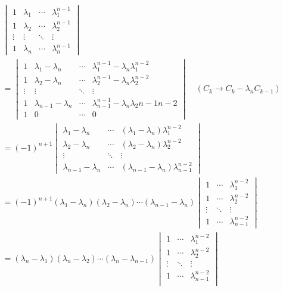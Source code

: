 \documentclass[a4paper]{article}
\begin{document}
\begin{align}
&\begin{vmatrix}
1&\lambda_1 & \cdots & \lambda_1^{n - 1} \\
1&\lambda_2 & \cdots & \lambda_2^{n - 1} \\
\vdots  & \vdots & \ddots & \vdots \\
1&\lambda_n & \cdots & \lambda_n^{n - 1}
\end{vmatrix}\\
&=
\begin{vmatrix}
1&\lambda_1 - \lambda_n & \cdots & \lambda_1^{n - 1} - \lambda_n \lambda_1^{n - 2} \\
1&\lambda_2 - \lambda_n & \cdots & \lambda_2^{n - 1} - \lambda_n \lambda_2^{n - 2} \\
\vdots  & \vdots & \ddots & \vdots \\
1&\lambda_{n - 1} - \lambda_n & \cdots & \lambda_{n - 1}^{n - 1} - \lambda_n \lambda_2{n - 1}{n - 2} \\
1& 0 & \cdots & 0
\end{vmatrix} \quad (C_k \rightarrow C_k - \lambda_n C_{k - 1}) \label{eq:col_op}\\
&= (-1)^{n + 1}
\begin{vmatrix}
\lambda_1 - \lambda_n & \cdots & (\lambda_1 - \lambda_n) \lambda_1^{n - 2} \\
\lambda_2 - \lambda_n & \cdots & (\lambda_2 - \lambda_n) \lambda_2^{n - 2} \\
\vdots & \ddots & \vdots \\
\lambda_{n - 1} - \lambda_n & \cdots & (\lambda_{n - 1} - \lambda_n) \lambda_{n - 1}^{n - 2}
\end{vmatrix}\\
&= (-1)^{n + 1} (\lambda_1 - \lambda_n) (\lambda_2 - \lambda_n) \cdots (\lambda_{n - 1} - \lambda_n)
\begin{vmatrix}
1 & \cdots & \lambda_1^{n - 2} \\
1 & \cdots & \lambda_2^{n - 2} \\
\vdots & \ddots & \vdots \\
1 & \cdots & \lambda_{n - 1}^{n - 2}
\end{vmatrix}\\
&= (\lambda_n - \lambda_1) (\lambda_n - \lambda_2) \cdots (\lambda_n - \lambda_{n - 1})
\begin{vmatrix}
1 & \cdots & \lambda_1^{n - 2} \\
1 & \cdots & \lambda_2^{n - 2} \\
\vdots & \ddots & \vdots \\
1 & \cdots & \lambda_{n - 1}^{n - 2} \\
\end{vmatrix}
\end{align}
\end{document}
